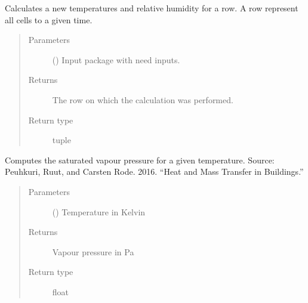 \documentclass[letterpaper,10pt,english]{sphinxmanual}
\begin{document}

\begin{fulllineitems}
\label{\detokenize{air:livestock.air.run_row}}
Calculates a new temperatures and relative humidity for a row. A row represent all cells to a given time.
\begin{quote}\begin{description}
\item[{Parameters}] \leavevmode
{} () \textendash{} Input package with need inputs.

\item[{Returns}] \leavevmode
The row on which the calculation was performed.

\item[{Return type}] \leavevmode
tuple

\end{description}\end{quote}

\end{fulllineitems}


\begin{fulllineitems}
\label{\detokenize{air:livestock.air.saturated_vapour_pressure}}
Computes the saturated vapour pressure for a given temperature.
Source: Peuhkuri, Ruut, and Carsten Rode. 2016.
“Heat and Mass Transfer in Buildings.”
\begin{quote}\begin{description}
\item[{Parameters}] \leavevmode
{} () \textendash{} Temperature in Kelvin

\item[{Returns}] \leavevmode
Vapour pressure in Pa

\item[{Return type}] \leavevmode
float

\end{description}\end{quote}

\end{fulllineitems}
\end{document}

